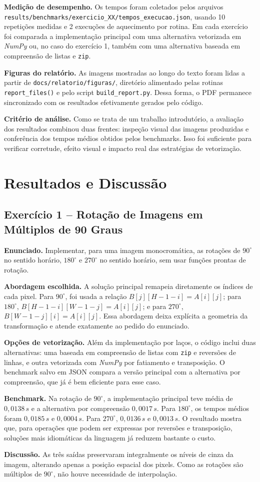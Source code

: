 \documentclass[12pt,a4paper]{article}
\newcommand{\arquivo}[1]{\nolinkurl{#1}}
\newcommand{\campo}[2]{\textbf{#1.} #2\par}
\newcommand{\exerciciosubsection}[2]{\subsection{Exercício #1 -- #2}}
\begin{document}
\campo{Medição de desempenho}{Os tempos foram coletados pelos arquivos \arquivo{results/benchmarks/exercicio\_XX/tempos\_execucao.json}, usando 10 repetições medidas e 2 execuções de aquecimento por rotina. Em cada exercício foi comparada a implementação principal com uma alternativa vetorizada em \textit{NumPy} ou, no caso do exercício 1, também com uma alternativa baseada em compreensão de listas e \texttt{zip}.}
\campo{Figuras do relatório}{As imagens mostradas ao longo do texto foram lidas a partir de \arquivo{docs/relatorio/figuras/}, diretório alimentado pelas rotinas \texttt{report\_files()} e pelo script \arquivo{build\_report.py}. Dessa forma, o PDF permanece sincronizado com os resultados efetivamente gerados pelo código.}
\campo{Critério de análise}{Como se trata de um trabalho introdutório, a avaliação dos resultados combinou duas frentes: inspeção visual das imagens produzidas e conferência dos tempos médios obtidos pelos benchmarks. Isso foi suficiente para verificar corretude, efeito visual e impacto real das estratégias de vetorização.}

\section{Resultados e Discussão}

\exerciciosubsection{1}{Rotação de Imagens em Múltiplos de 90 Graus}

\campo{Enunciado}{Implementar, para uma imagem monocromática, as rotações de $90^\circ$ no sentido horário, $180^\circ$ e $270^\circ$ no sentido horário, sem usar funções prontas de rotação.}
\campo{Abordagem escolhida}{A solução principal remapeia diretamente os índices de cada pixel. Para $90^\circ$, foi usada a relação $B[j][H-1-i]=A[i][j]$; para $180^\circ$, $B[H-1-i][W-1-j]=A[i][j]$; e para $270^\circ$, $B[W-1-j][i]=A[i][j]$. Essa abordagem deixa explícita a geometria da transformação e atende exatamente ao pedido do enunciado.}
\campo{Opções de vetorização}{Além da implementação por laços, o código inclui duas alternativas: uma baseada em compreensão de listas com \texttt{zip} e reversões de linhas, e outra vetorizada com \textit{NumPy} por fatiamento e transposição. O benchmark salvo em JSON compara a versão principal com a alternativa por compreensão, que já é bem eficiente para esse caso.}
\campo{Benchmark}{Na rotação de $90^\circ$, a implementação principal teve média de $0{,}0138\,s$ e a alternativa por compreensão $0{,}0017\,s$. Para $180^\circ$, os tempos médios foram $0{,}0185\,s$ e $0{,}0004\,s$. Para $270^\circ$, $0{,}0136\,s$ e $0{,}0013\,s$. O resultado mostra que, para operações que podem ser expressas por reversões e transposição, soluções mais idiomáticas da linguagem já reduzem bastante o custo.}
\campo{Discussão}{As três saídas preservaram integralmente os níveis de cinza da imagem, alterando apenas a posição espacial dos pixels. Como as rotações são múltiplos de $90^\circ$, não houve necessidade de interpolação.}
\end{document}
